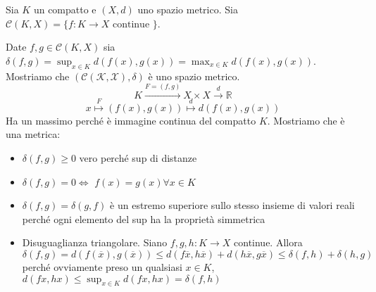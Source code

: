 \begin{example}
    Sia \(K\) un compatto e \((X, d)\) uno spazio metrico. Sia \(\mathcal{C}(K,
    X) = \{f : K \to X \text{ continue }\} \). 

    Date \(f, g \in \mathcal{C}(K, X)\) sia \(\delta(f, g) = \sup_{x \in K}
    d(f(x), g(x)) = \max_{x \in K} d(f(x), g(x))\). Mostriamo che \((\mathcal{C(K, X), \delta})\) è uno spazio
    metrico. 
    \[
        K \stackrel{F = (f, g)}{\longrightarrow } X \times X \stackrel{d}{\to } \mathbb{R}
    \]
    \[
        x \stackrel{F}{ \mapsto } (f(x), g(x)) \stackrel{d}{ \mapsto } d(f(x), g(x))
    \]
    Ha un massimo perché è immagine continua del compatto \(K\). Mostriamo che è
    una metrica:
\begin{itemize}[label = --]
    \item \(\delta(f, g) \ge 0\) vero perché sup di distanze 
    \item \(\delta(f,g) = 0 \iff\) \(f(x) = g(x) \forall x \in K\) 
    \item \(\delta(f, g) = \delta(g,f)\) è un estremo superiore sullo stesso
        insieme di valori reali perché ogni elemento del sup ha la proprietà
        simmetrica
    \item Disuguaglianza triangolare. Siano \(f, g, h : K \to X\) continue.
        Allora \(\delta(f, g) = d(f(\overline{x}), g(\overline{x})) \le
        d(f\overline{x}, h\overline{x}) + d(h\overline{x}, g\overline{x}) \le
        \delta(f, h) + \delta(h, g)\) perché ovviamente preso un qualsiasi \(x
        \in K\), \(d(fx, hx) \le \sup_{x \in K}d(fx, hx) = \delta(f, h)\) 
\end{itemize}
 
\end{example}






